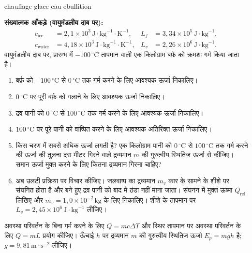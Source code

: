 
\begin{exo}[ठंडी बर्फ़ से उबलते पानी तक: परिमाण-क्रम]{chauffage-glace-eau-ebullition}

\textbf{संख्यात्मक आँकड़े (वायुमंडलीय दाब पर):}
\[
\begin{aligned}
c_{\text{ice}} &= 2{,}1\times10^3\,\text{J}\!\cdot\!\text{kg}^{-1}\!\cdot\!\text{K}^{-1},
& L_f &= 3{,}34\times10^5\,\text{J}\!\cdot\!\text{kg}^{-1},\\
c_{\text{water}} &= 4{,}18\times10^3\,\text{J}\!\cdot\!\text{kg}^{-1}\!\cdot\!\text{K}^{-1},
& L_v &= 2{,}26\times10^6\,\text{J}\!\cdot\!\text{kg}^{-1}.
\end{aligned}
\]
वायुमंडलीय दाब पर, प्रारम्भ में $-100\,{}^\circ\text{C}$ तापमान वाली एक किलोग्राम बर्फ़ को क्रमशः गर्म किया जाता है।

\begin{enumerate}
  \item बर्फ़ को $-100\,{}^\circ\text{C}$ से $0\,{}^\circ\text{C}$ तक गर्म करने के लिए आवश्यक ऊर्जा निकालिए।
  \item $0\,{}^\circ\text{C}$ पर पूरी बर्फ़ को गलाने के लिए आवश्यक ऊर्जा निकालिए।
  \item द्रव पानी को $0\,{}^\circ\text{C}$ से $100\,{}^\circ\text{C}$ तक गर्म करने के लिए आवश्यक ऊर्जा निकालिए।
  \item $100\,{}^\circ\text{C}$ पर पूरे पानी को वाष्पित करने के लिए आवश्यक अतिरिक्त ऊर्जा निकालिए।
  \item किस चरण में सबसे अधिक ऊर्जा लगती है? एक किलोग्राम पानी को $0\,{}^\circ\text{C}$ से $100\,{}^\circ\text{C}$ तक गर्म करने की ऊर्जा की तुलना दस मीटर गिरने वाले द्रव्यमान $m$ की गुरुत्वीय स्थितिज ऊर्जा से कीजिए। समान ऊर्जा मुक्त करने के लिए कितना द्रव्यमान गिरना चाहिए?
  \item अब उलटी प्रक्रिया पर विचार कीजिए। जलवाष्प का द्रव्यमान $m_v$ कार के सामने के शीशे पर संघनित होता है और बने हुए द्रव पानी को बाद में ठंडा नहीं माना जाता। संघनन में मुक्त ऊष्मा $Q_{\text{rel}}$ लिखिए और $m_v=1{,}0\times10^{-2}\,\text{kg}$ के लिए निकालिए। शीशे के तापमान पर $L_v=2{,}45\times10^6\,\text{J}\!\cdot\!\text{kg}^{-1}$ लीजिए।
\end{enumerate}

\begin{indication}
अवस्था परिवर्तन के बिना गर्म करने के लिए $Q=mc\Delta T$ और स्थिर तापमान पर अवस्था परिवर्तन के लिए $Q=mL$ प्रयोग कीजिए। ऊँचाई $h$ पर द्रव्यमान $m$ की गुरुत्वीय स्थितिज ऊर्जा $E_p=mgh$ है; $g=9{,}81\,\text{m}\!\cdot\!\text{s}^{-2}$ लीजिए।
\end{indication}


\end{exo}
